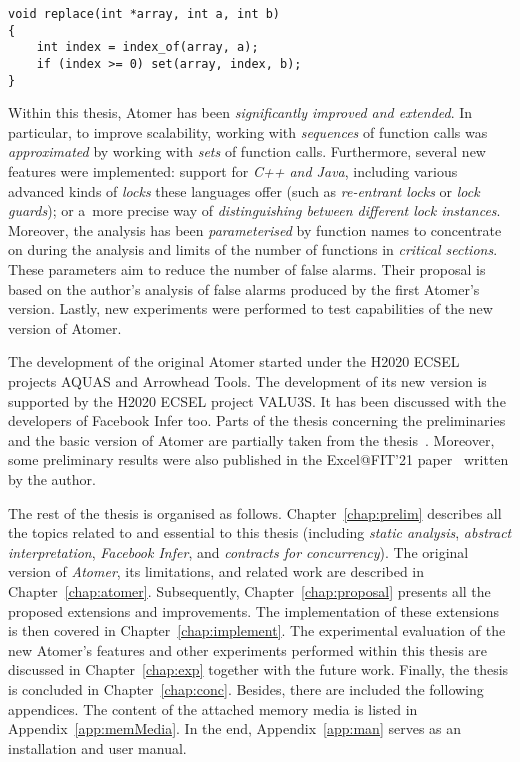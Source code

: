 \begin{lstlisting}[style=c, label={list:exampleViolation}, float=hbt, caption={An example of an \emph{atomicity violation}}]
void replace(int *array, int a, int b) 
{
    int index = index_of(array, a);
    if (index >= 0) set(array, index, b);
}
\end{lstlisting}

Within this thesis, Atomer has been \emph{significantly improved and extended}. In particular, to improve scalability, working with \emph{sequences} of function calls was \emph{approximated} by working with \emph{sets} of function calls. Furthermore, several new features were implemented: support for \emph{C++ and Java}, including various advanced kinds of \emph{locks} these languages offer (such as \emph{re-entrant locks} or \emph{lock guards}); or a~more precise way of \emph{distinguishing between different lock instances}. Moreover, the analysis has been \emph{parameterised} by function names to concentrate on during the analysis and limits of the number of functions in \emph{critical sections}. These parameters aim to reduce the number of false alarms. Their proposal is based on the author's analysis of false alarms produced by the first Atomer's version. Lastly, new experiments were performed to test capabilities of the new version of Atomer.

The development of the original Atomer started under the H2020 ECSEL projects AQUAS and Arrowhead Tools. The development of its new version is supported by the H2020 ECSEL project VALU3S. It has been discussed with the developers of Facebook Infer too. Parts of the thesis concerning the preliminaries and the basic version of Atomer are partially taken from the thesis~\cite{harmimBP}. Moreover, some preliminary results were also published in the Excel@FIT'21 paper~\cite{excel2021Harmim} written by the author.

The rest of the thesis is organised as follows. Chapter~\ref{chap:prelim} describes all the topics related to and essential to this thesis (including \emph{static analysis}, \emph{abstract interpretation}, \emph{Facebook Infer}, and \emph{contracts for concurrency}). The original version of \emph{Atomer}, its limitations, and related work are described in Chapter~\ref{chap:atomer}. Subsequently, Chapter~\ref{chap:proposal} presents all the proposed extensions and improvements. The implementation of these extensions is then covered in Chapter~\ref{chap:implement}. The experimental evaluation of the new Atomer's features and other experiments performed within this thesis are discussed in Chapter~\ref{chap:exp} together with the future work. Finally, the thesis is concluded in Chapter~\ref{chap:conc}. Besides, there are included the following appendices. The content of the attached memory media is listed in Appendix~\ref{app:memMedia}. In the end, Appendix~\ref{app:man} serves as an installation and user manual.



